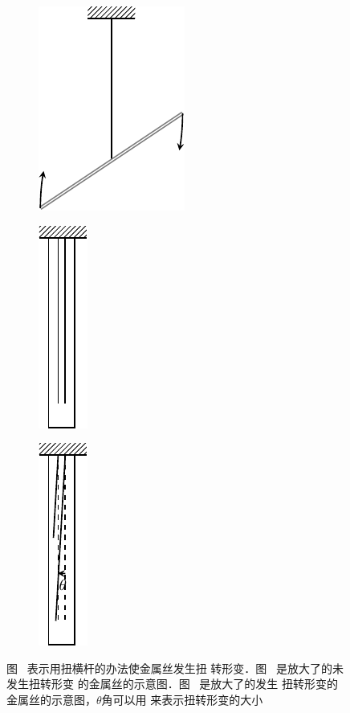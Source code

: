 \begin{figure}[htbp]
    \centering
    \begin{subfigure} {0.32\linewidth} 
        \centering
        \includegraphics{fig/A/1-11a.pdf} 
        \caption{}\label{fig_A_1-11a} 
    \end{subfigure} 
    \hfil
    \begin{subfigure} {0.32\linewidth} 
        \centering
        \includegraphics{fig/A/1-11b.pdf} 
        \caption{}\label{fig_A_1-11b} 
    \end{subfigure} 
    \hfil
    \begin{subfigure} {0.32\linewidth} 
        \centering
        \includegraphics{fig/A/1-11c.pdf} 
        \caption{}\label{fig_A_1-11c} 
    \end{subfigure} 
    \caption{图~ 表示用扭横杆的办法使金属丝发生扭
    转形变．图~ 是放大了的未发生扭转形变
    的金属丝的示意图．图~ 是放大了的发生
    扭转形变的金属丝的示意图，$\theta$角可以用
    来表示扭转形变的大小} \label{fig_A_1-11} 
\end{figure} 



